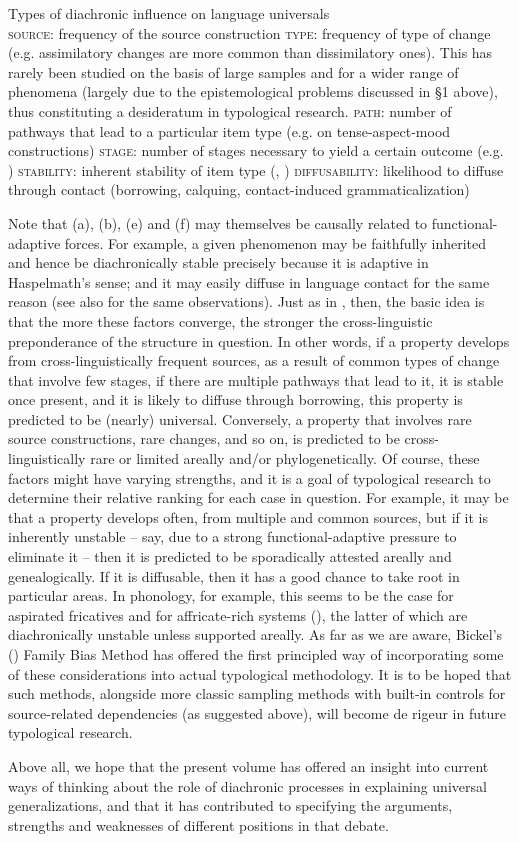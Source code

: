\documentclass[output=paper]{langsci/langscibook}
\begin{document}
\ea
Types of diachronic influence on language universals\\
  \ea \textsc{source}: frequency of the source construction 
  \ex \textsc{type}: frequency of type of change (e.g. assimilatory changes are more common than dissimilatory ones). This has rarely been studied on the basis of large samples and for a wider range of phenomena (largely due to the epistemological problems discussed in §1 above), thus constituting a desideratum in typological research.
  \ex \textsc{path}: number of pathways that lead to a particular item type (e.g. \citealt{BybeeEtAl1994} on tense-aspect-mood constructions)
  \ex \textsc{stage}: number of stages necessary to yield a certain outcome (e.g. \citealt{Harris2008})
  \ex \textsc{stability}: inherent stability of item type (\citealt{Greenberg1978_Diachr}, \citealt{Nichols2003}) 
  \ex \textsc{diffusability:} likelihood to diffuse through contact (borrowing, calquing, contact-induced grammaticalization)
  \z
\z

Note that (a), (b), (e) and (f) may themselves be causally related to functional-adaptive forces. For example, a given phenomenon may be faithfully inherited and hence be diachronically stable precisely because it is adaptive in Haspelmath’s sense; and it may easily diffuse in language contact for the same reason (see also \citealt{Bickel2013,Bickel2017} for the same observations). 
Just as in \citet{Greenberg1978_Diachr}, then, the basic idea is that the more these factors converge, the stronger the cross-linguistic preponderance of the structure in question. In other words, if a property develops from cross-linguistically frequent sources, as a result of common types of change that involve few stages, if there are multiple pathways that lead to it, it is stable once present, and it is likely to diffuse through borrowing, this property is predicted to be (nearly) universal. Conversely, a property that involves rare source constructions, rare changes, and so on, is predicted to be cross-linguistically rare or limited areally and/or phylogenetically. Of course, these factors might have varying strengths, and it is a goal of typological research to determine their relative ranking for each case in question. For example, it may be that a property develops often, from multiple and common sources, but if it is inherently unstable – say, due to a strong functional-adaptive pressure to eliminate it – then it is predicted to be sporadically attested areally and genealogically. If it is diffusable, then it has a good chance to take root in particular areas. In phonology, for example, this seems to be the case for aspirated fricatives \citep{Jacques2011} and for affricate-rich systems (\citealt{NikolaevGrossman2018}), the latter of which are diachronically unstable unless supported areally. As far as we are aware, Bickel’s (\citeyear{Bickel2011_Modelling,Bickel2013}) Family Bias Method has offered the first principled way of incorporating some of these considerations into actual typological methodology. It is to be hoped that such methods, alongside more classic sampling methods with built-in controls for source-related dependencies (as suggested above), will become de rigeur in future typological research.

Above all, we hope that the present volume has offered an insight into current ways of thinking about the role of diachronic processes in explaining universal generalizations, and that it has contributed to specifying the arguments, strengths and weaknesses of different positions in that debate.

 
\end{document}
